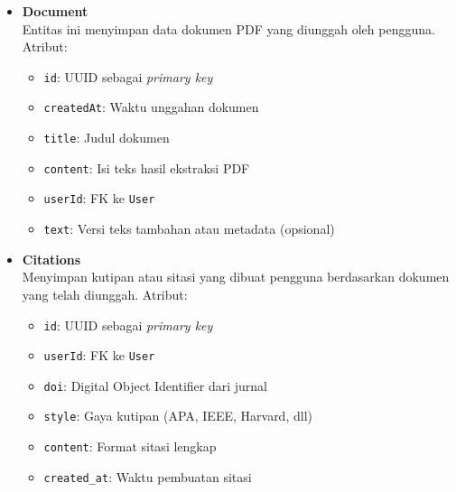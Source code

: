 \begin{itemize}
  \item \textbf{Document} \\
  Entitas ini menyimpan data dokumen PDF yang diunggah oleh pengguna. Atribut:
  \begin{itemize}
    \item \texttt{id}: UUID sebagai \textit{primary key}
    \item \texttt{createdAt}: Waktu unggahan dokumen
    \item \texttt{title}: Judul dokumen
    \item \texttt{content}: Isi teks hasil ekstraksi PDF
    \item \texttt{userId}: FK ke \texttt{User}
    \item \texttt{text}: Versi teks tambahan atau metadata (opsional)
  \end{itemize}

  \item \textbf{Citations} \\
  Menyimpan kutipan atau sitasi yang dibuat pengguna berdasarkan dokumen yang telah diunggah. Atribut:
  \begin{itemize}
    \item \texttt{id}: UUID sebagai \textit{primary key}
    \item \texttt{userId}: FK ke \texttt{User}
    \item \texttt{doi}: Digital Object Identifier dari jurnal
    \item \texttt{style}: Gaya kutipan (APA, IEEE, Harvard, dll)
    \item \texttt{content}: Format sitasi lengkap
    \item \texttt{created\_at}: Waktu pembuatan sitasi
  \end{itemize}
\end{itemize}